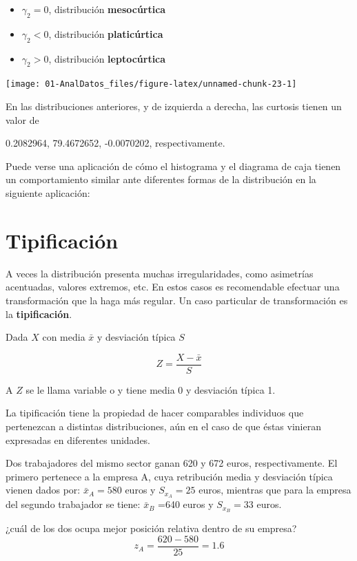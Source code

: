 \documentclass[]{book}
\theoremstyle{definition}
\theoremstyle{definition}
\theoremstyle{definition}
\theoremstyle{remark}
\begin{document}
\begin{itemize}
\item
  \(\gamma_2= 0\), distribución \textbf{mesocúrtica}
\item
  \(\gamma_2< 0\), distribución \textbf{platicúrtica}
\item
  \(\gamma_2> 0\), distribución \textbf{leptocúrtica}
\end{itemize}

\begin{center}\texttt{[image: 01-AnalDatos\_files/figure-latex/unnamed-chunk-23-1]} \end{center}

En las distribuciones anteriores, y de izquierda a derecha, las curtosis
tienen un valor de

0.2082964, 79.4672652, -0.0070202, respectivamente.

Puede verse una aplicación de cómo el histograma y el diagrama de caja
tienen un comportamiento similar ante diferentes formas de la
distribución en la siguiente aplicación:

\section{Tipificación}\label{tipificacion}

A veces la distribución presenta muchas irregularidades, como asimetrías
acentuadas, valores extremos, etc. En estos casos es recomendable
efectuar una transformación que la haga más regular. Un caso particular
de transformación es la \textbf{tipificación}.

Dada \(X\) con media \(\bar{x}\) y desviación típica \(S\)

\[Z  =  \frac{X  -  \bar{x}}{S}\]

A \(Z\) se le llama variable o y tiene media 0 y desviación típica 1.

La tipificación tiene la propiedad de hacer comparables individuos que
pertenezcan a distintas distribuciones, aún en el caso de que éstas
vinieran expresadas en diferentes unidades.

Dos trabajadores del mismo sector ganan 620 y 672 euros,
respectivamente. El primero pertenece a la empresa A, cuya retribución
media y desviación típica vienen dados por: \(\bar{x}_A= 580\) euros y
\(S_{x_A} = 25\) euros, mientras que para la empresa del segundo
trabajador se tiene: \(\bar{x}_B\) =640 euros y \(S_{x_B} = 33\) euros.

¿cuál de los dos ocupa mejor posición relativa dentro de su empresa?
\[z_A=\frac{620-580}{25}=1.6\]
\end{document}
